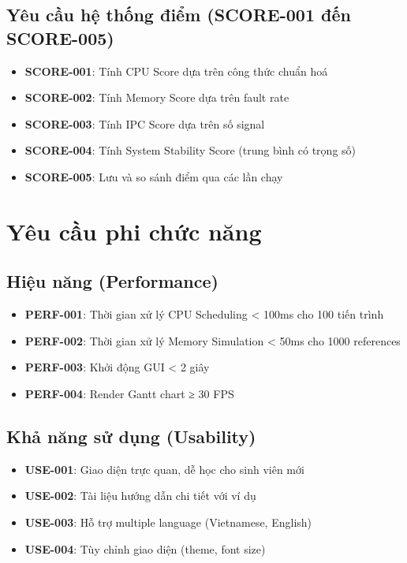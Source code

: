 \subsection{Yêu cầu hệ thống điểm (SCORE-001 đến SCORE-005)}

\begin{itemize}[leftmargin=1.5cm]
  \item \textbf{SCORE-001}: Tính CPU Score dựa trên công thức chuẩn hoá
  \item \textbf{SCORE-002}: Tính Memory Score dựa trên fault rate
  \item \textbf{SCORE-003}: Tính IPC Score dựa trên số signal
  \item \textbf{SCORE-004}: Tính System Stability Score (trung bình có trọng số)
  \item \textbf{SCORE-005}: Lưu và so sánh điểm qua các lần chạy
\end{itemize}

\section{Yêu cầu phi chức năng}

\subsection{Hiệu năng (Performance)}

\begin{itemize}[leftmargin=1.5cm]
  \item \textbf{PERF-001}: Thời gian xử lý CPU Scheduling < 100ms cho 100 tiến trình
  \item \textbf{PERF-002}: Thời gian xử lý Memory Simulation < 50ms cho 1000 references
  \item \textbf{PERF-003}: Khởi động GUI < 2 giây
  \item \textbf{PERF-004}: Render Gantt chart ≥ 30 FPS
\end{itemize}

\subsection{Khả năng sử dụng (Usability)}

\begin{itemize}[leftmargin=1.5cm]
  \item \textbf{USE-001}: Giao diện trực quan, dễ học cho sinh viên mới
  \item \textbf{USE-002}: Tài liệu hướng dẫn chi tiết với ví dụ
  \item \textbf{USE-003}: Hỗ trợ multiple language (Vietnamese, English)
  \item \textbf{USE-004}: Tùy chỉnh giao diện (theme, font size)
\end{itemize}

